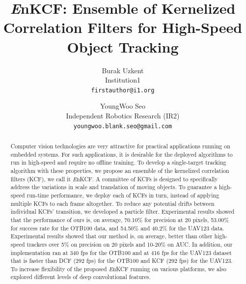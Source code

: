 \documentclass[10pt,twocolumn,letterpaper]{article}
\begin{document}
\title{{\it E}nKCF: Ensemble of Kernelized Correlation Filters for
  High-Speed Object Tracking}

\author{Burak Uzkent \\
Institution1\\
{\tt\small firstauthor@i1.org}
\and
YoungWoo Seo \\
Independent Robotics Research (IR2)\\
{\tt\small youngwoo.blank.seo@gmail.com}
}

\maketitle
\ifwacvfinal\thispagestyle{empty}\fi

\begin{abstract}
Computer vision technologies are very attractive for practical
applications running on embedded systems. For such applications, it is
desirable for the deployed algorithms to run in high-speed and require
no offline training. To develop a single-target tracking algorithm
with these properties, we propose an ensemble of the kernelized
correlation filters (KCF), we call it {\it E}nKCF. A committee of KCFs
is designed to specifically address the variations in scale and
translation of moving objects. To guarantee a high-speed run-time
performance, we deploy each of KCFs in turn, instead of applying
multiple KCFs to each frame altogether. To reduce any potential drifts
between individual KCFs' transition, we developed a particle
filter. Experimental results showed that the performance of ours is,
on average, 70.10\% for precision at 20 pixels, 53.00\% for success
rate for the OTB100 data, and 54.50\% and 40.2\% for the UAV123
data. Experimental results showed that our method is, on average,
better than other high-speed trackers over 5\% on precision on 20
pixels and 10-20\% on AUC. In addition, our implementation ran at 340
fps for the OTB100 and at 416 fps for the UAV123 dataset that is
faster than DCF (292 fps) for the OTB100 and KCF (292 fps) for the
UAV123. To increase flexibility of the proposed {\it E}nKCF running on
various platforms, we also explored different levels of deep
convolutional features.
\end{abstract}
\end{document}
